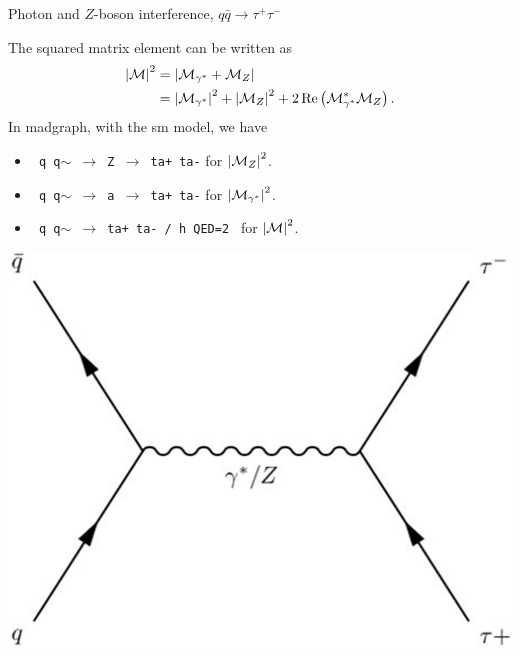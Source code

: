 \documentclass{../bredelebeamer}
\begin{document}
\begin{frame}{Photon and $Z$-boson interference, $q \bar q \longrightarrow \tau^+ \tau^- $}
    
    \begin{minipage}{0.65\textwidth}
        The squared matrix element can be written as
        \begin{equation}
            \begin{aligned}
                \abs{\mathcal{M}}^2 & =\abs{\mathcal{M}_{\gamma^*}+\mathcal{M}_{Z}}
                \\&= \abs{\mathcal{M}_{\gamma^*}}^2 + \abs{\mathcal{M}_{Z}}^2 + 2\Re\left( \mathcal{M}_{\gamma^*}^*\mathcal{M}_{Z} \right).    \notag
            \end{aligned}
        \end{equation}
        In madgraph, with the sm model, we have
        \begin{itemize}
            \item \texttt{ q q$\sim$ $\rightarrow$ Z $\rightarrow$ ta+ ta-} for $\abs{\mathcal{M}_{Z}}^2$.
            \item \texttt{ q q$\sim$ $\rightarrow$ a $\rightarrow$ ta+ ta-} for $\abs{\mathcal{M}_{\gamma^*}}^2$.
            \item \texttt{ q q$\sim$ $\rightarrow$ ta+ ta- / h QED=2 } for $\abs{\mathcal{M}}^2$.
        \end{itemize}
    \end{minipage}
    \hfill
    \begin{minipage}{0.33\textwidth}
        \begin{center}
            \includegraphics[width=\linewidth]{DY.png}
        \end{center}
    \end{minipage}
    \pause
    $ $\\$ $\\$ $


\end{frame}
\end{document}
